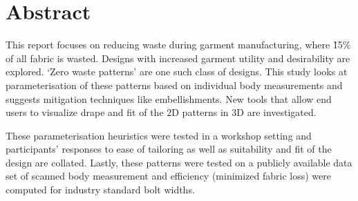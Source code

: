 \chapter*{Abstract}

This report focuses on reducing waste during garment manufacturing, where \~15\% of all fabric is wasted. Designs with increased garment utility and desirability are explored. ‘Zero waste patterns’ are one such class of designs. This study looks at parameterisation of these patterns based on individual body measurements and suggests mitigation techniques like embellishments. New tools that allow end users to visualize drape and fit of the 2D patterns in 3D are investigated.

These parameterisation heuristics were tested in a workshop setting and participants’ responses to ease of tailoring as well as suitability and fit of the design are collated. Lastly, these patterns were tested on a publicly available data set of scanned body measurement and efficiency (minimized fabric loss) were computed for industry standard bolt widths. 

